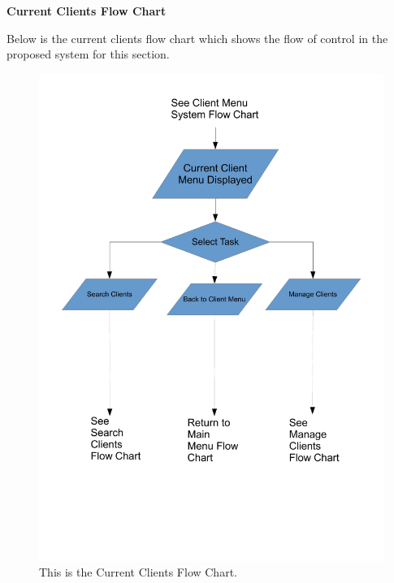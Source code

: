 \pagebreak
\textbf{Current Clients Flow Chart}
\begin{flushleft}
Below is the current clients flow chart which shows the flow of control in the proposed system for this section.
\end{flushleft}
\begin{figure}[H]
    \includegraphics[scale=0.5]{./Design/images/FlowChartCurrentClients.pdf}
    \caption{This is the Current Clients Flow Chart.} 
\label{fig:FlowChartCurrentClients}
\end{figure}

